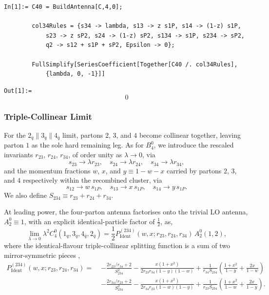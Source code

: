\begin{mdframed}[backgroundcolor=gray!10, linewidth=0pt]
\begin{lstlisting}
In[1]:= C40 = BuildAntenna[C,4,0];

        col34Rules = {s34 -> lambda, s13 -> z s1P, s14 -> (1-z) s1P,
            s23 -> z sP2, s24 -> (1-z) sP2, s134 -> s1P, s234 -> sP2,
            q2 -> s12 + s1P + sP2, Epsilon -> 0};

        FullSimplify[SeriesCoefficient[Together[C40 /. col34Rules],
            {lambda, 0, -1}]]
\end{lstlisting}
\texttt{Out[1]:=}
    \begin{equation*}
        0
    \end{equation*}
\end{mdframed}

\subsubsection{Triple-Collinear Limit}

For the $2_{\bar q}\parallel 3_q\parallel 4_{\bar q}$ limit, partons $2$, $3$, and $4$ become collinear together, leaving
parton $1$ as the sole hard remaining leg. As for $B_4^0$, we introduce the rescaled invariants
$r_{23}$, $r_{24}$, $r_{34}$, of order unity as $\lambda\to0$, via
\begin{equation}
    s_{23}\to\lambda r_{23},\quad s_{24}\to\lambda r_{24},\quad s_{34}\to\lambda r_{34},
\end{equation}
and the momentum fractions $w$, $x$, and $y\equiv1-w-x$ carried by partons $2$, $3$, and $4$
respectively within the recombined cluster, via
\begin{equation}
    s_{12}\to w\,s_{1P},\quad s_{13}\to x\,s_{1P},\quad s_{14}\to y\,s_{1P}.
\end{equation}
We also define $S_{234}\equiv r_{23}+r_{24}+r_{34}$.

At leading power, the four-parton antenna factorises onto the trivial LO antenna, $A_2^0\equiv1$, with an
explicit identical-particle factor of $\frac12$, as,
\begin{equation}
    \lim_{\lambda\to0}\lambda^2 C_4^0(1_q,3_q,4_{\bar q},2_{\bar q}) = \frac12 P_\mathrm{Ident}^{(234)}(w,x;r_{23},r_{24},r_{34})\,A_2^0(1,2),
\end{equation}
where the identical-flavour triple-collinear splitting function is a sum of two mirror-symmetric pieces \cite{Gehrmann-DeRidder:2005btv},
\begin{equation}
    \begin{split}
        P_\mathrm{Ident}^{(234)}(w,x;r_{23},r_{24},r_{34}) =\;&
            -\frac{2r_{23}/r_{34}+2}{S_{234}^2}-\frac{x(1+x^2)}{2r_{23}r_{34}(1-y)(1-w)}+\frac1{r_{34}S_{234}}\left(\frac{1+x^2}{1-y}+\frac{2x}{1-w}\right)\\
            &-\frac{2r_{34}/r_{23}+2}{S_{234}^2}-\frac{x(1+x^2)}{2r_{34}r_{23}(1-w)(1-y)}+\frac1{r_{23}S_{234}}\left(\frac{1+x^2}{1-w}+\frac{2x}{1-y}\right).
    \end{split}
\end{equation}


